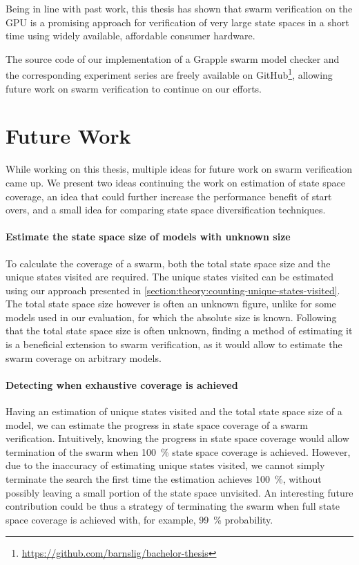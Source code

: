 \documentclass[
fancyheadings, %
%
%
]{stsreprt}
\begin{document}
Being in line with past work, this thesis has shown that swarm verification on the GPU is a promising approach for verification of very large state spaces in a short time using widely available, affordable consumer hardware.

The source code of our implementation of a Grapple swarm model checker and the corresponding experiment series are freely available on GitHub\footnote{\url{https://github.com/barnslig/bachelor-thesis}}, allowing future work on swarm verification to continue on our efforts.

\section{Future Work}
\label{section:conclusions:future-work}

While working on this thesis, multiple ideas for future work on swarm verification came up.
We present two ideas continuing the work on estimation of state space coverage, an idea that could further increase the performance benefit of start overs, and a small idea for comparing state space diversification techniques.

\paragraph{Estimate the state space size of models with unknown size}
To calculate the coverage of a swarm, both the total state space size and the unique states visited are required.
The unique states visited can be estimated using our approach presented in \cref{section:theory:counting-unique-states-visited}.
The total state space size however is often an unknown figure, unlike for some models used in our evaluation, for which the absolute size is known.
Following that the total state space size is often unknown, finding a method of estimating it is a beneficial extension to swarm verification, as it would allow to estimate the swarm coverage on arbitrary models.

\paragraph{Detecting when exhaustive coverage is achieved}
Having an estimation of unique states visited and the total state space size of a model, we can estimate the progress in state space coverage of a swarm verification.
Intuitively, knowing the progress in state space coverage would allow termination of the swarm when \SI{100}{\percent} state space coverage is achieved.
However, due to the inaccuracy of estimating unique states visited, we cannot simply terminate the search the first time the estimation achieves \SI{100}{\percent}, without possibly leaving a small portion of the state space unvisited.
An interesting future contribution could be thus a strategy of terminating the swarm when full state space coverage is achieved with, for example, \SI{99}{\percent} probability.
\end{document}
